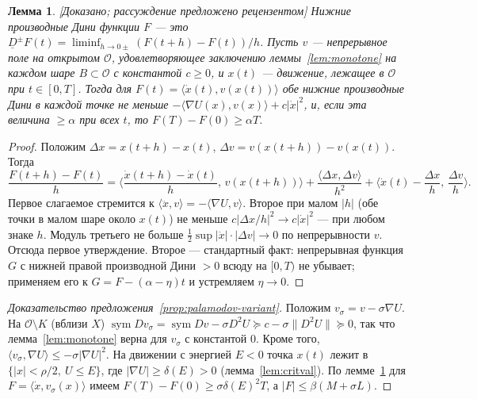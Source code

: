 \documentclass[11pt,a4paper]{article}
\newtheorem{lemma}[theorem]{Лемма}
\theoremstyle{definition}
\newcommand{\sym}{\operatorname{sym}}
\newcommand{\mk}[1]{\textsf{[#1]}}
\begin{document}
\begin{lemma}\label{lem:dini}
\mk{Доказано; рассуждение предложено рецензентом} Нижние производные Дини функции $F$ ---
это $\underline D^{\pm}F(t)=\liminf_{h\to0\pm}(F(t+h)-F(t))/h$. Пусть $v$ --- непрерывное поле на открытом
$\mathcal O$, удовлетворяющее заключению леммы~\ref{lem:monotone} на каждом шаре
$B\subset\mathcal O$ с константой $c\ge0$, и $x(t)$ --- движение, лежащее в $\mathcal O$ при
$t\in[0,T]$. Тогда для $F(t)=\langle\dot x(t),v(x(t))\rangle$ обе нижние производные Дини в каждой
точке не меньше $-\langle\nabla U(x),v(x)\rangle+c|\dot x|^2$, и, если эта величина $\ge\alpha$ при
всех $t$, то $F(T)-F(0)\ge\alpha T$.
\end{lemma}
\begin{proof}
Положим $\Delta x=x(t+h)-x(t)$, $\Delta v=v(x(t+h))-v(x(t))$. Тогда
\[
\frac{F(t+h)-F(t)}h=\Big\langle\frac{\dot x(t+h)-\dot x(t)}h,\,v(x(t+h))\Big\rangle
+\frac{\langle\Delta x,\Delta v\rangle}{h^2}+\Big\langle\dot x(t)-\frac{\Delta x}h,\,\frac{\Delta v}h\Big\rangle .
\]
Первое слагаемое стремится к $\langle\ddot x,v\rangle=-\langle\nabla U,v\rangle$. Второе при малом
$|h|$ (обе точки в малом шаре около $x(t)$) не меньше $c|\Delta x/h|^2\to c|\dot x|^2$ --- при любом
знаке $h$. Модуль третьего не больше $\tfrac12\sup|\ddot x|\cdot|\Delta v|\to0$ по непрерывности $v$.
Отсюда первое утверждение. Второе --- стандартный факт: непрерывная функция $G$ с нижней правой
производной Дини $>0$ всюду на $[0,T)$ не убывает; применяем его к $G=F-(\alpha-\eta)t$ и
устремляем $\eta\to0$.
\end{proof}

\begin{proof}[Доказательство предложения~\ref{prop:palamodov-variant}]
Положим $v_\sigma=v-\sigma\nabla U$. На $\mathcal O\setminus K$ (вблизи $X$)
$\sym Dv_\sigma=\sym Dv-\sigma D^2U\succeq c-\sigma\lVert D^2U\rVert\succeq0$, так что
лемма~\ref{lem:monotone} верна для $v_\sigma$ с константой $0$. Кроме того,
$\langle v_\sigma,\nabla U\rangle\le-\sigma|\nabla U|^2$. На движении с энергией $E<0$ точка $x(t)$
лежит в $\{|x|<\rho/2,\ U\le E\}$, где $|\nabla U|\ge\delta(E)>0$ (лемма~\ref{lem:critval}). По
лемме~\ref{lem:dini} для $F=\langle\dot x,v_\sigma(x)\rangle$ имеем
$F(T)-F(0)\ge\sigma\delta(E)^2T$, а $|F|\le\beta(M+\sigma L)$.
\end{proof}
\end{document}
